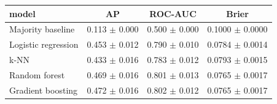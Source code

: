 \begin{tabular}{lccc}
\toprule
model & AP & ROC-AUC & Brier \\
\midrule
Majority baseline & 0.113 $\pm$ 0.000 & 0.500 $\pm$ 0.000 & 0.1000 $\pm$ 0.0000 \\
Logistic regression & 0.453 $\pm$ 0.012 & 0.790 $\pm$ 0.010 & 0.0784 $\pm$ 0.0014 \\
k-NN & 0.433 $\pm$ 0.016 & 0.783 $\pm$ 0.012 & 0.0793 $\pm$ 0.0015 \\
Random forest & 0.469 $\pm$ 0.016 & 0.801 $\pm$ 0.013 & 0.0765 $\pm$ 0.0017 \\
Gradient boosting & 0.472 $\pm$ 0.016 & 0.802 $\pm$ 0.012 & 0.0765 $\pm$ 0.0017 \\
\bottomrule
\end{tabular}